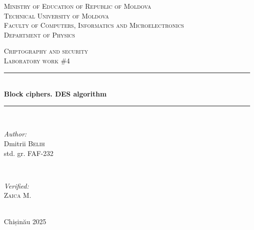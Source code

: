 \documentclass[12pt]{article}
\begin{document}
\begin{titlepage}
   \begin{center}
    \textsc{\large Ministry of Education of Republic of Moldova}\\[0.5cm]
    \textsc{\large Technical University of Moldova}\\[0.5cm]
    \textsc{\large Faculty of Computers, Informatics and Microelectronics}\\[0.5cm]
    \textsc{\large Department of Physics}\\[1.2cm]
    
    \vspace{25 mm}
    
    \textsc{\Large Criptography and security}\\[0.5cm]
    \textsc{\large Laboratory work \#4}\\[0.5cm]    %
    
    \newcommand{\HRule}{\rule{\linewidth}{0.5mm}}
    \vspace{10 mm}
    \HRule \\[0.4cm]
    { \LARGE \bfseries Block ciphers. DES algorithm}\\[0.4cm] %
    \HRule \\[1.5cm]
    
    \vspace{10mm}
    
    \begin{minipage}[t]{0.4\textwidth}
    \begin{flushleft} \large
    \emph{Author:} \\
    Dmitrii \textsc{Belih}\\                         %
    std. gr. FAF-232                                %
    \end{flushleft}
    \end{minipage}
    ~
    \begin{minipage}[t]{0.4\textwidth}
    \begin{flushright} \large
    \emph{Verified:} \\
    \textsc{Zaica} M.\\
    \end{flushright}
    \end{minipage}\\[3cm]
    
    \vspace{5 mm}
    \large Chișinău 2025\\[0.5cm]
    
    \vfill
    \end{center}
\end{titlepage}
\end{document}
